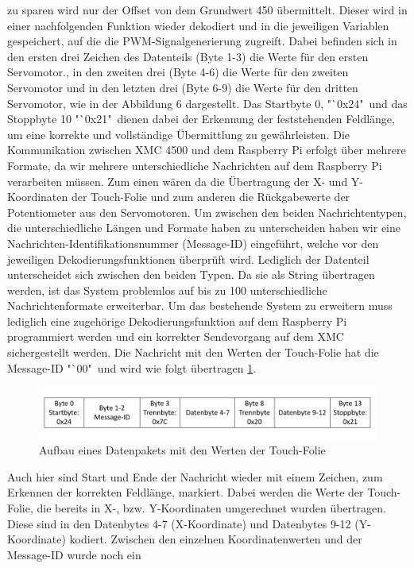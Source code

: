 \documentclass[12pt,a4paper,bibliography=totoc,listof=totoc]{scrartcl}
\begin{document}
zu sparen wird nur der Offset von dem Grundwert 450 übermittelt. Dieser wird in einer nachfolgenden 
Funktion wieder dekodiert und in die jeweiligen Variablen gespeichert, auf die die PWM-Signalgenerierung 
zugreift. Dabei befinden sich in den ersten drei Zeichen des Datenteils (Byte 1-3) die Werte für den ersten 
Servomotor., in den zweiten drei (Byte 4-6) die Werte für den zweiten Servomotor und in den letzten drei 
(Byte 6-9) die Werte für den dritten Servomotor, wie in der Abbildung 6 dargestellt. Das Startbyte 0, 
"`0x24"\, und das Stoppbyte 10 "`0x21"\, dienen dabei der Erkennung der feststehenden Feldlänge, um eine korrekte 
und vollständige Übermittlung zu gewährleisten. Die Kommunikation zwischen XMC 4500 und dem Raspberry Pi 
erfolgt über mehrere Formate, da wir mehrere unterschiedliche Nachrichten auf dem Raspberry Pi verarbeiten 
müssen. Zum einen wären da die Übertragung der X- und Y-Koordinaten der Touch-Folie und zum anderen die 
Rückgabewerte der Potentiometer aus den Servomotoren. Um zwischen den beiden Nachrichtentypen, die 
unterschiedliche Längen und Formate haben zu unterscheiden haben wir eine Nachrichten-Identifikationsnummer 
(Message-ID) eingeführt, welche vor den jeweiligen Dekodierungsfunktionen überprüft wird. Lediglich der 
Datenteil unterscheidet sich zwischen den beiden Typen. Da sie als String übertragen werden, ist das 
System problemlos auf bis zu 100 unterschiedliche Nachrichtenformate erweiterbar. Um das bestehende System 
zu erweitern muss lediglich eine zugehörige Dekodierungsfunktion auf dem Raspberry Pi programmiert werden 
und ein korrekter Sendevorgang auf dem XMC sichergestellt werden. Die Nachricht mit den Werten der 
Touch-Folie hat die Message-ID "`00" \,und wird wie folgt übertragen \ref{UART Platte}.
\begin{figure}[htbp]
	\centering
	\includegraphics[scale = 0.5]{pics/Uartplatte}
	\caption{Aufbau eines Datenpakets mit den Werten der Touch-Folie}
	\label{UART Platte}
\end{figure}
Auch hier sind Start und Ende der Nachricht wieder mit einem Zeichen, zum Erkennen der korrekten 
Feldlänge, markiert. Dabei werden die Werte der Touch-Folie, die bereits in X-, bzw. Y-Koordinaten 
umgerechnet wurden übertragen. Diese sind in den Datenbytes 4-7 (X-Koordinate) und Datenbytes 9-12 
(Y-Koordinate) kodiert. Zwischen den einzelnen Koordinatenwerten und der Message-ID wurde noch ein 
\end{document}
